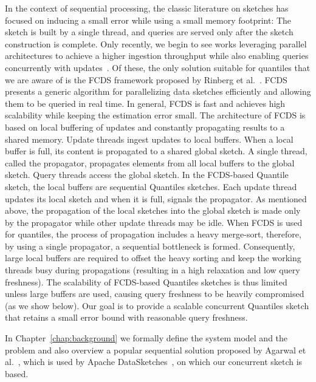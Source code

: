 In the context of sequential processing, the classic literature on sketches has focused on inducing a small error while using a small memory footprint: The sketch is built by a single thread, and queries are served only after the sketch construction is complete. Only recently, we begin to see works leveraging parallel architectures to achieve a higher ingestion throughput while also enabling queries concurrently with updates~\cite{Rinberg_2020_fast_sketches, stylianopoulos2020delegation}. 
Of these, the only solution suitable for quantiles that we are aware of is the \acrfull{FCDS} framework proposed by Rinberg et al.~\cite{Rinberg_2020_fast_sketches}. FCDS presents a generic algorithm for parallelizing data sketches efficiently and allowing them to be queried in real time. In general, FCDS is fast and achieves high scalability while keeping the estimation error small. The architecture of FCDS is based on local buffering of updates and constantly propagating results to a shared memory. Update threads ingest updates to local buffers. When a local buffer is full, its content is propagated to a shared global sketch. A single thread, called the propagator, propagates elements from all local buffers to the global sketch. Query threads access the global sketch.
In the FCDS-based Quantile sketch, the local buffers are sequential Quantiles sketches. Each update thread updates its local sketch and when it is full, signals the propagator. As mentioned above, the propagation of the local sketches into the global sketch is made only by the propagator while other update threads may be idle. When FCDS is used for quantiles, the process of propagation includes a heavy merge-sort, therefore, by using a single propagator, a sequential bottleneck is formed. Consequently, large local buffers are required to offset the heavy sorting and keep the working threads busy during propagations (resulting in a high relaxation and low query freshness). The scalability of FCDS-based Quantiles sketches is thus limited unless large buffers are used, causing query freshness to be heavily compromised (as we show below). Our goal is to provide a scalable concurrent Quantiles sketch that retains a small error bound with reasonable query freshness.


In Chapter~\ref{chap:background} we formally define the system model and the problem and also overview a popular sequential solution proposed by Agarwal et al.~\cite{mergeables_summaries}, which is used by Apache DataSketches~\cite{DataSketches}, on which our concurrent sketch is based.


